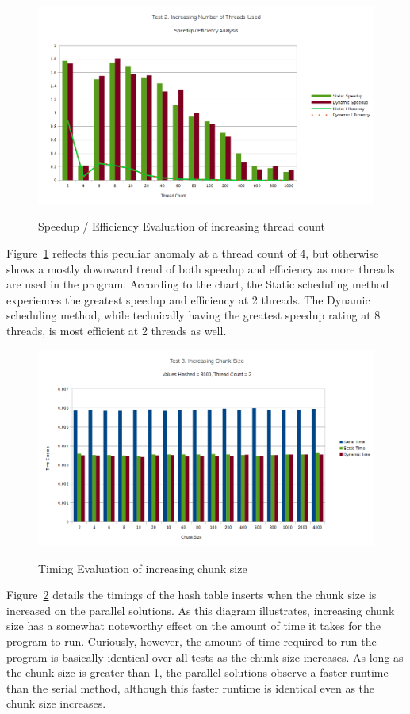 \documentclass{article}
\begin{document}
\begin{figure}[H]
  \caption{Speedup / Efficiency Evaluation of increasing thread count}
  \centering
  \includegraphics[width=\textwidth]{chart2b}
    \label{fig:chart2b}
\end{figure}

Figure~\ref{fig:chart2b} reflects this peculiar anomaly at a thread count of 4, but otherwise shows a mostly 
downward trend of both speedup and efficiency as more threads are used in the program. According to the chart, 
the Static scheduling method experiences the greatest speedup and efficiency at 2 threads. The Dynamic scheduling 
method, while technically having the greatest speedup rating at 8 threads, is most efficient at 2 threads as well.

\begin{figure}[H]
  \caption{Timing Evaluation of increasing chunk size}
  \centering
  \includegraphics[width=\textwidth]{chart3a}
    \label{fig:chart3a}
\end{figure}

Figure~\ref{fig:chart3a} details the timings of the hash table inserts when the chunk size is increased on the 
parallel solutions. As this diagram illustrates, increasing chunk size has a somewhat noteworthy effect on the 
amount of time it takes for the program to run. Curiously, however, the amount of time required to run the program 
is basically identical over all tests as the chunk size increases. As long as the chunk size is greater than 1, the 
parallel solutions observe a faster runtime than the serial method, although this faster runtime is identical even 
as the chunk size increases.
\end{document}
